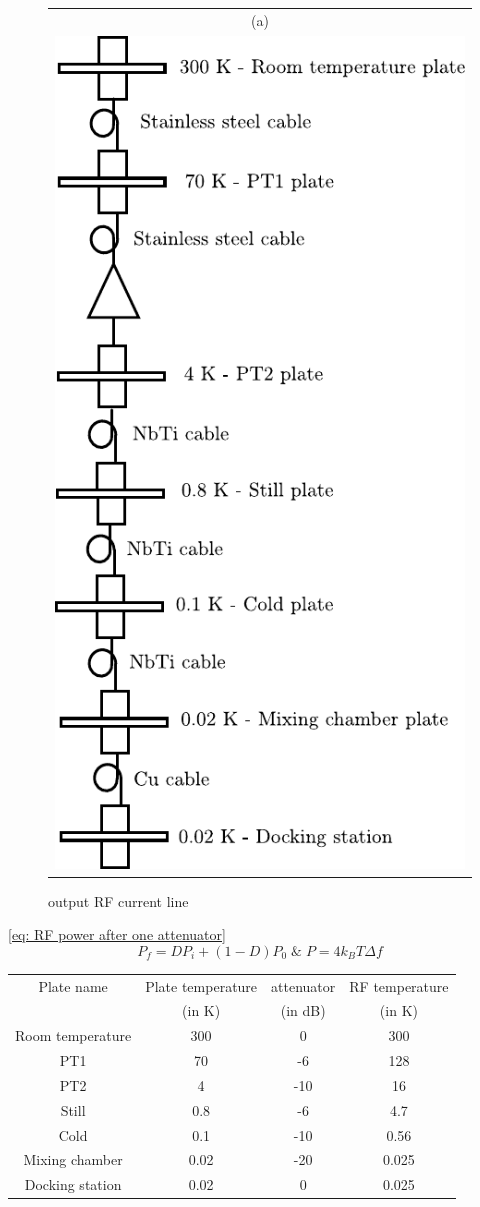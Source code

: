 \begin{figure}[hptb]
	\begin{center}
		\begin{tabular}{c}
			(a) \\ 
			
			\includegraphics[height = 12 cm]{./appB/output_RF_current_line}
		\end{tabular}
	\end{center}
	
	\caption{output RF current line}
	\label{fig: output RF current line}
\end{figure}

\eqref{eq: RF power after one attenuator}
\begin{equation}
P_{f} = DP_{i}+\left(1-D\right)P_{0}\;\&\; P=4k_{B}T\Delta f \label{eq: RF power after one attenuator} 
\end{equation}

\begin{tabular}{|c||c|c|c|}
	\hline 
	Plate name & Plate temperature & attenuator & RF temperature \\ 
	 & (in K) & (in dB) & (in K) \\ 
	\hline
	\hline 
	Room temperature & 300 & 0 & 300 \\ 
	\hline 
	PT1 & 70 & -6 & 128 \\ 
	\hline 
	PT2 & 4 & -10 & 16 \\ 
	\hline 
	Still & 0.8 & -6 & 4.7 \\ 
	\hline 
	Cold & 0.1 & -10 & 0.56 \\ 
	\hline 
	Mixing chamber & 0.02 & -20 & 0.025 \\ 
	\hline 
	Docking station & 0.02 & 0 & 0.025 \\ 
	\hline 
\end{tabular} 